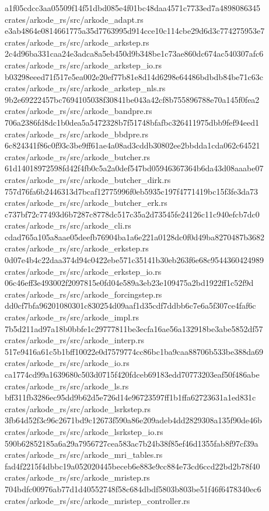 \documentclass[
  10pt,
]{article}
\newenvironment{Shaded}{}{}
\newcommand{\NormalTok}[1]{#1}
\begin{document}
\begin{Shaded}
\begin{Highlighting}[]
\NormalTok{a1f05cdcc3aa05509f14f51dbd085e4f01bc48daa4571c7733ed7a4898086345  crates/arkode\_rs/src/arkode\_adapt.rs}
\NormalTok{e3ab4864e0814661775a35d7763995d914cce10c114cbe29d6d3c774275953e7  crates/arkode\_rs/src/arkode\_arkstep.rs}
\NormalTok{2c4d96ba331caa24e3adca8a5eb450d9b348be1c73ae860dc674ac540307afc6  crates/arkode\_rs/src/arkode\_arkstep\_io.rs}
\NormalTok{b03298eeed71f517e5ea002e20ef77b81e8d14d6298e64486bdbdb84be71c63c  crates/arkode\_rs/src/arkode\_arkstep\_nls.rs}
\NormalTok{9b2e69222457bc7694105038f30841be043a42cf8b755896788e70a145f0fea2  crates/arkode\_rs/src/arkode\_bandpre.rs}
\NormalTok{706a2386fd8dc1b0dea5a5472328b7f51748bfafbc326411975dbb9fef94eed1  crates/arkode\_rs/src/arkode\_bbdpre.rs}
\NormalTok{6c824341f86c0f93c3be9ff61ae4a08ad3cddb30802ee2bbdda1cda062c64521  crates/arkode\_rs/src/arkode\_butcher.rs}
\NormalTok{61d14018972598fd42f4fb0c5a2a0def547bd05946367364b6da43d08aaabe07  crates/arkode\_rs/src/arkode\_butcher\_dirk.rs}
\NormalTok{757d76fa6b2446313d7bcaf12775996f0eb5935c197f4771419bc15f3fe3da73  crates/arkode\_rs/src/arkode\_butcher\_erk.rs}
\NormalTok{c737bf72c77493d6b7287c8778dc517c35a2d73545fe24126c11c940efcb7dc0  crates/arkode\_rs/src/arkode\_cli.rs}
\NormalTok{cdad765a105a8aae05deefb76904ba1a6e221a0128dc0f0d49ba8270487b3682  crates/arkode\_rs/src/arkode\_erkstep.rs}
\NormalTok{0d07e4b4c22daa374d94c0422ebe571c35141b30eb263f6e68c9544360424989  crates/arkode\_rs/src/arkode\_erkstep\_io.rs}
\NormalTok{06c46eff3e493002f2097815e0fd04e589a3eb23e109475a2bd1922ff1c52f9d  crates/arkode\_rs/src/arkode\_forcingstep.rs}
\NormalTok{dd0cf7bfa96201080301c830254d09aaf1d35cdf7ddbb6c7e6a5f307ce4faf6c  crates/arkode\_rs/src/arkode\_impl.rs}
\NormalTok{7b5d211ad97a18b0bbfe1c29777811be3ecfa16ae56a132918be3abe5852df57  crates/arkode\_rs/src/arkode\_interp.rs}
\NormalTok{517e9416a61c5b1bff10022e0d7579774cc86bc1ba9caa88706b533be388da69  crates/arkode\_rs/src/arkode\_io.rs}
\NormalTok{ca1774cd99a1639680c503d0715f420fdceb69183edd70773203eaf50f486abe  crates/arkode\_rs/src/arkode\_ls.rs}
\NormalTok{bff311fb3286ec95dd9b62d5e726d14e96723597ff1b1ffa62723631a1ed831c  crates/arkode\_rs/src/arkode\_lsrkstep.rs}
\NormalTok{3fb64d52f3c96c2671bd9c12673f590a86e209adeb4dd2829308a135f90de46b  crates/arkode\_rs/src/arkode\_lsrkstep\_io.rs}
\NormalTok{590b62852185a6a29a7956727cea583ac7b24b38f85ef46d1355fab8f97cf39a  crates/arkode\_rs/src/arkode\_mri\_tables.rs}
\NormalTok{fad4f2215f4dbbc19a052020445beceb6e883e9cc884e73cd6ccd22bd2b78f40  crates/arkode\_rs/src/arkode\_mristep.rs}
\NormalTok{704bdfc00976ab77d1d40552748f58c684dbdf5803b803be51f46f6478340ec6  crates/arkode\_rs/src/arkode\_mristep\_controller.rs}

\end{Highlighting}
\end{Shaded}
\end{document}
